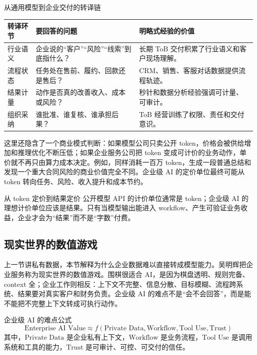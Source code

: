 \begin{knowledgebox}{从通用模型到企业交付的转译链}
\begin{tabularx}{\textwidth}{p{}p{}X}
\toprule
转译环节 & 要回答的问题 & 明略式经验的价值 \\
\midrule
行业语义 & 企业说的“客户”“风险”“线索”到底指什么？ & 长期 ToB 交付积累了行业语义和客户现场理解。 \\
流程状态 & 任务处在售前、履约、回款还是售后？ & CRM、销售、客服对话数据提供流程轨迹。 \\
结果计量 & 动作是否真的改善收入、成本或风险？ & 秒针和数据分析经验强调可计量、可审计。 \\
组织采纳 & 谁批准、谁复核、谁承担后果？ & ToB 经营训练了权限、责任和交付意识。 \\
\bottomrule
\end{tabularx}
\end{knowledgebox}

这里还隐含了一个商业模式判断：如果模型公司只卖公开 token，价格会被供给增加和推理优化不断压低；如果企业服务公司把 token 变成可计价的业务动作，单价就不再只由算力成本决定。例如，同样消耗一百万 token，生成一段普通总结和发现一个重大合同风险的商业价值完全不同。企业级 AI 的定价单位最终可能从 token 转向任务、风险、收入提升和成本节约。

\begin{importantbox}{从 token 定价到结果定价}
公开模型 API 的计价单位通常是 token；企业级 AI 的理想计价单位应该是结果。只有当模型输出能进入 workflow、产生可验证业务收益，企业才会为“结果”而不是“字数”付费。
\end{importantbox}

\subsection{现实世界的数值游戏}

上一节讲私有数据，本节解释为什么企业数据难以直接转成模型能力。吴明辉把企业服务称为现实世界的数值游戏。围棋很适合 AI，是因为棋盘透明、规则完备、context 全；企业工作则相反：上下文不完整、信息分散、目标模糊、流程跨系统、结果要对真实客户和财务负责。企业级 AI 的难点不是“会不会回答”，而是能不能把不完整上下文转成可执行动作。

\begin{importantbox}{企业级 AI 的难点公式}
\[
\text{Enterprise AI Value} \approx f(\text{Private Data}, \text{Workflow}, \text{Tool Use}, \text{Trust})
\]
其中，\(\text{Private Data}\) 是企业私有上下文，\(\text{Workflow}\) 是业务流程，\(\text{Tool Use}\) 是调用系统和工具的能力，\(\text{Trust}\) 是可审计、可控、可交付的信任。
\end{importantbox}

